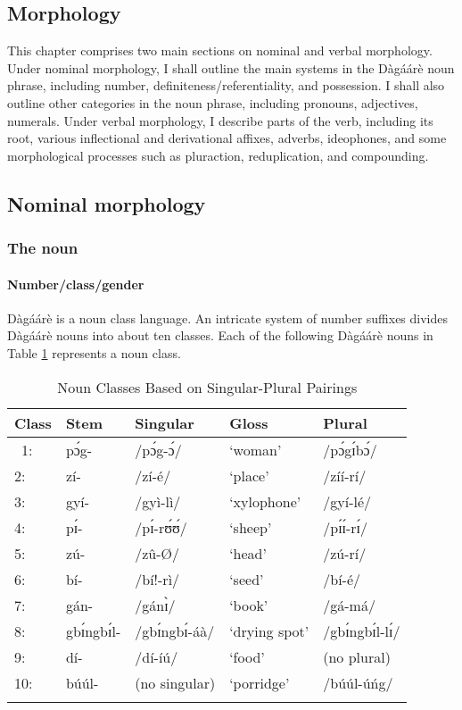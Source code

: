 \begin{refsection}
\section{Morphology}

This chapter comprises two main sections on nominal and verbal morphology. Under
nominal morphology, I shall outline the main systems in the Dàgáárè noun phrase, including
number, definiteness/referentiality, and possession. I shall also outline other categories in the
noun phrase, including pronouns, adjectives, numerals. Under verbal morphology, I describe
parts of the verb, including its root, various inflectional and derivational affixes, adverbs,
ideophones, and some morphological processes such as pluraction, reduplication, and
compounding.

\subsection{Nominal morphology}
\subsubsection{ The noun}
\paragraph{Number/class/gender}

Dàgáárè is a noun class language. An intricate system of number suffixes divides Dàgáárè nouns into about ten classes. Each of the following Dàgáárè nouns in  Table  \ref{tab:classstems}
represents a noun class.
\begin{table}[]
    \centering
    \begin{tabular}{lllll}\lsptoprule
Class & Stem & Singular & Gloss &Plural\\\midrule
   \ 1: & pɔ́g-& /pɔ́g-ɔ́/& ‘woman’& /pɔ́gɪ́bɔ́/  \\
2: &zí- &/zí-é/ &‘place’&/zíí-rí/ \\
3:& gyí-& /gyì-lì/& ‘xylophone’& /gyí-lé/\\
4: &pɪ́-& /pɪ́-rʊ́ʊ́/& ‘sheep’& /pɪ́ɪ́-rɪ́/\\
5: &zú-& /zû-Ø/& ‘head’ &/zú-rí/\\
6: &bí-& /bí!-rì/ &‘seed’ &/bí-é/\\
7: &gán- &/gánɪ̀/ &‘book’ &/gá-má/\\
8: &gbɪ́ngbɪ́l-& /gbɪ́ngbɪ́-áà/& ‘drying spot’& /gbɪ́ngbɪ́l-lɪ́/\\
9: &dí-& /dí-íú/& ‘food’& (no plural)\\
10: & búúl- &(no singular) &‘porridge’& /búúl-úńg/\\\lspbottomrule
    \end{tabular}
    \caption{Noun Classes Based on Singular-Plural Pairings}
    \label{tab:classstems}
\end{table}


\end{refsection}
